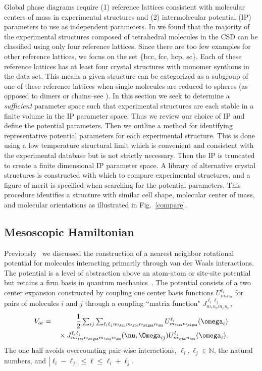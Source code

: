 \documentclass[preprint]{iucr}              %
\newcommand{\mb}[1]{\ensuremath{\mbox{\boldmath $ #1 $}}}
\begin{document}
Global phase diagrams require (1) reference lattices consistent with
molecular centers of mass in experimental structures and (2)
intermolecular potential (IP) parameters to use as independent
parameters. In \cite{McClurg09} we found that the majority of the
experimental structures composed of tetrahedral molecules in the CSD can be
classified using only four reference lattices. Since there are too few examples
for other reference lattices, we focus on the set \{bcc, fcc,
hcp, sc\}. Each of these reference lattices has at least four crystal
structures with monomer synthons in the data set.  This means a given structure
can be categorized as a subgroup of one of these reference lattices when single
molecules are reduced to spheres (as opposed to dimers or chains--see
\cite{McClurg09}).  In this section we seek to determine a \emph{sufficient}
parameter space such that experimental
structures are each stable in a finite volume in the IP parameter space. Thus we
review
our choice of IP and define the potential parameters.  Then we
outline a method for identifying representative potential parameters
for each experimental structure. This is done using a low
temperature structural limit which is convenient and consistent with the
experimental database but is not strictly necessary.  Then
the IP is truncated to create a finite dimensional IP parameter
space.  A library of alternative crystal structures is constructed
with which to compare experimental structures, and a figure of merit
is specified when searching for the potential parameters. This
procedure identifies a structure with similar cell shape, molecular
center of mass, and molecular orientations as illustrated in
Fig.~\ref{compare}.

\subsection{Mesoscopic Hamiltonian}
\label{hamiltonian}

Previously~\cite{Mettes04} we discussed the construction of a
nearest neighbor rotational potential for molecules interacting primarily
through van der Waals interactions.
The potential is a level of abstraction above an atom-atom or site-site
potential but retains a firm basis in quantum
mechanics~\cite{Avoird94}. The potential consists of a two center
expansion constructed by coupling one center basis functions
$U^{\ell_i}_{m_\tau n_\sigma}$ 
for pairs of molecules $i$ and $j$ through a coupling ``matrix function" 
$J_{m_\tau n_\sigma m_\rho n_\mu}^{\ell_i\ell_j}$,
\begin{eqnarray}
\label{re:eq:vij2}V_{\mathrm{or}} &=&
\frac{1}{2}\sum_{ij}\sum_{\ell_i\ell_j m_\tau m_\rho n_\sigma n_\mu}
U^{\ell_i}_{m_\tau n_\sigma}(\mb{\omega}_i)\nonumber\\
&&{}\times J_{m_\tau n_\sigma m_\rho n_\mu}^{\ell_i
\ell_j}(\mb{\nu},\mb{\Omega}_{ij})U^{\ell_j}_{m_\rho
n_\mu}(\mb{\omega}_i).
\end{eqnarray}
The one half avoids overcounting pair-wise interactions,
$\ell_i,\ell_j\in\mathbb{N}$, the
natural numbers, and $|\ell_i-\ell_j|\leq\ell\leq \ell_i+\ell_j$.
\end{document}
